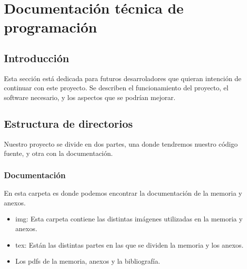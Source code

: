 \chapter[Documentación del programador]{Documentación técnica de programación}

\section{Introducción}
Esta sección está dedicada para futuros desarroladores que quieran intención de continuar con este proyecto. Se describen el funcionamiento del proyecto, el software necesario, y los aspectos que se podrían mejorar.

\section{Estructura de directorios}
Nuestro proyecto se divide en dos partes, una donde tendremos nuestro código fuente, y otra con la documentación.

\subsection{Documentación}
En esta carpeta es donde podemos encontrar la documentación de la memoria y anexos.
\begin{itemize}
	\item img: Esta carpeta contiene las distintas imágenes utilizadas en la memoria y anexos.
	\item tex: Están las distintas partes en las que se dividen la memoria y los anexos.
	\item Los pdfs de la memoria, anexos y la bibliografía.
\end{itemize}

